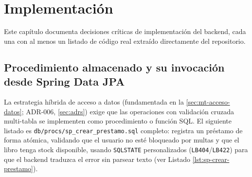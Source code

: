 \chapter{Implementación}
\label{cap:implementacion}

Este capítulo documenta decisiones críticas de implementación del
backend, cada una con al menos un listado de código real extraído
directamente del repositorio.

\section{Procedimiento almacenado y su invocación desde Spring Data JPA}
\label{sec:sp-invocacion}

La estrategia híbrida de acceso a datos (fundamentada en la
\autoref{sec:mt-acceso-datos}; ADR-006, \autoref{sec:adrs})
exige que las operaciones con validación cruzada multi-tabla se
implementen como procedimiento o función SQL. El siguiente listado es
\texttt{db/procs/sp\_crear\_prestamo.sql} completo: registra un préstamo
de forma atómica, validando que el usuario no esté bloqueado por multas
y que el libro tenga stock disponible, usando \texttt{SQLSTATE}
personalizados (\texttt{LB404}/\texttt{LB422}) para que el backend
traduzca el error sin parsear texto (ver Listado \ref{lst:sp-crear-prestamo}).

